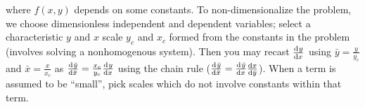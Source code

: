 \documentclass[8pt]{article}
\begin{document}
\begin{multicols}{2}
\begin{description}
    where $f(x,y)$ depends on some constants. To non-dimensionalize the problem,
    we choose dimensionless independent and dependent variables; select a
    characteristic $y$ and $x$ scale $y_c$ and $x_c$ formed from the constants
    in the problem (involves solving a nonhomogenous system). Then you may
    recast $\frac{\mathrm{d}^{} {y}}{\mathrm{d}{x}^{}}$ using $\bar{y}=\frac{y}{y_c}$ and $\bar{x}=\frac{x}{x_c}$
    as $\frac{\mathrm{d}^{} {\bar{y}}}{\mathrm{d}{\bar{x}}^{}}=\frac{x_c}{y_c}\frac{\mathrm{d}^{} {y}}{\mathrm{d}{x}^{}}$ using the chain rule
    ($\frac{\mathrm{d}^{} {\bar{y}}}{\mathrm{d}{\bar{x}}^{}}=\frac{\mathrm{d}^{} {\bar{y}}}{\mathrm{d}{x}^{}}\frac{\mathrm{d}{x}}{\mathrm{d}{\bar{y}}}$). When a
    term is assumed to be ``small'', pick scales which do not involve constants
    within that term.
   \end{description}
 \end{multicols}
\end{document}
